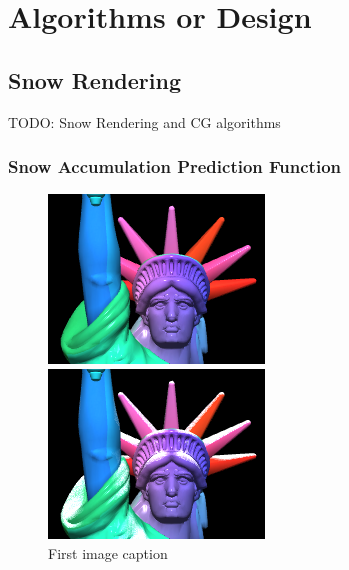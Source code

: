 \documentclass{article}
\begin{document}
\section {Algorithms or Design}


\subsection {Snow Rendering}
TODO: Snow Rendering and CG algorithms
\subsubsection {Snow Accumulation Prediction Function}



\begin{figure}[h]
  \centering
  \begin{minipage}{0.45\textwidth}
      \centering
      \includegraphics[width=\textwidth]{images/HeadManualWithoutSnow.png} %
      \caption{First image caption}
      \label{fig:image1}
  \end{minipage}\hfill
  \begin{minipage}{0.45\textwidth}
      \centering
      \includegraphics[width=\textwidth]{images/HeadManualWithSnow.png} %

\end{minipage}
\end{figure}
\end{document}

